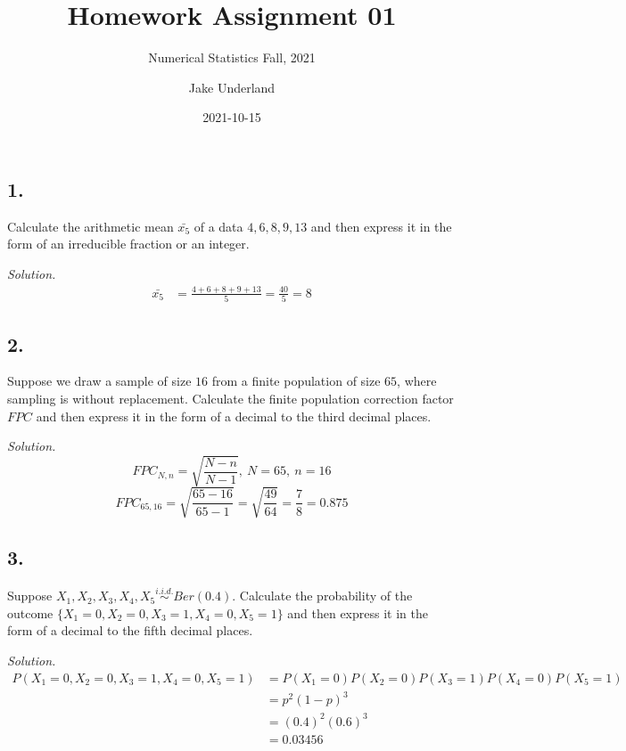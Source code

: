 \documentclass[
]{article}
\title{Homework Assignment 01}
\subtitle{Numerical Statistics Fall, 2021}
\author{Jake Underland}
\date{2021-10-15}
\begin{document}
\maketitle

\hypertarget{section}{%
\subsection{1.}\label{section}}

Calculate the arithmetic mean \(\bar{x_5}\) of a data \(4, 6, 8, 9, 13\)
and then express it in the form of an irreducible fraction or an
integer.

\textit{Solution.}\\
\[\begin{aligned}
\bar{x_5} &= \frac{4+ 6+ 8+ 9+ 13}{5} = \frac{40}{5} = 8
\end{aligned}\]

\hypertarget{section-1}{%
\subsection{2.}\label{section-1}}

Suppose we draw a sample of size \(16\) from a finite population of size
\(65\), where sampling is without replacement. Calculate the finite
population correction factor \(FPC\) and then express it in the form of
a decimal to the third decimal places.

\textit{Solution.}\\
\[FPC_{N, n} = \sqrt{\frac{N-n}{N-1}}, \: N = 65, \: n = 16\]
\[FPC_{65,16} = \sqrt{\frac{65-16}{65-1}} = \sqrt{\frac{49}{64}} = \frac{7}{8} = 0.875\]

\hypertarget{section-2}{%
\subsection{3.}\label{section-2}}

Suppose \(X_1, X_2, X_3, X_4, X_5 \stackrel{i.i.d.}{\sim} Ber (0.4)\).
Calculate the probability of the outcome
\(\{X_1 =0, X_2 = 0, X_3 = 1, X_4 = 0, X_5 = 1\}\) and then express it
in the form of a decimal to the fifth decimal places.

\textit{Solution.}\\
\[\begin{aligned}
P(X_1 = 0, X_2 = 0, X_3 = 1, X_4 = 0, X_5 = 1)
&= P(X_1 = 0) P(X_2 = 0) P(X_3 = 1) P(X_4 =0) P(X_5 = 1) \\
&= p^2(1-p)^3 \\
&= (0.4)^2(0.6)^3 \\
&= 0.03456
\end{aligned}\]
\end{document}
